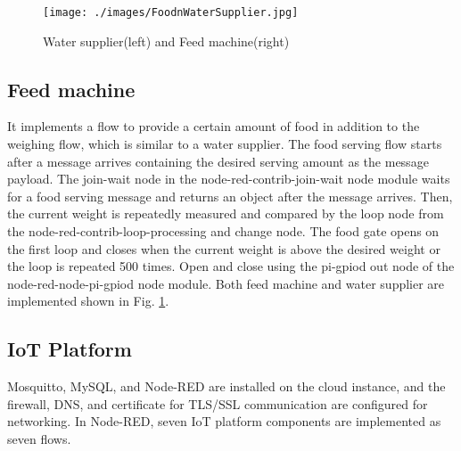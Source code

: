 \documentclass[conference]{IEEEtran}
\begin{document}

\begin{figure}[htbp]
\centerline{\texttt{[image: ./images/FoodnWaterSupplier.jpg]}}
\caption{Water supplier(left) and Feed machine(right)}
\label{fig11new}
\end{figure}

\subsection{Feed machine}
It implements a flow to provide a certain amount of food in addition to the weighing flow, which is similar to a water supplier. 
The food serving flow starts after a message arrives containing the desired serving amount as the message payload.
The join-wait node in the node-red-contrib-join-wait node module waits for a food serving message and returns an object after the message arrives.
Then, the current weight is repeatedly measured and compared by the loop node from the node-red-contrib-loop-processing and change node.
The food gate opens on the first loop and closes when the current weight is above the desired weight or the loop is repeated 500 times.
Open and close using the pi-gpiod out node of the node-red-node-pi-gpiod node module. 
Both feed machine and water supplier are implemented shown in Fig. \ref{fig11new}.

\subsection{IoT Platform}
Mosquitto, MySQL, and Node-RED are installed on the cloud instance, and the firewall, DNS, and certificate for TLS/SSL communication are configured for networking.
In Node-RED, seven IoT platform components are implemented as seven flows.

\end{document}
